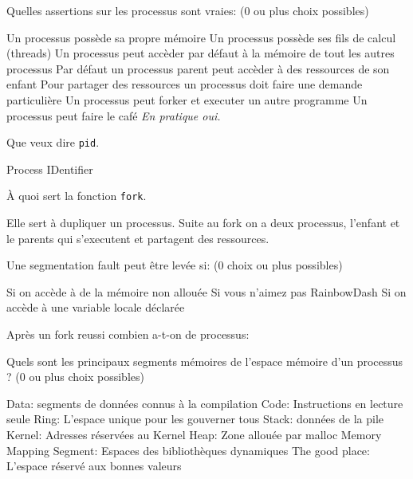 \documentclass[11pt,a4paper,addpoint,answers]{exam}
\begin{document}
  \begin{questions}

    \question[1] Quelles assertions sur les processus sont vraies: (0 ou plus choix possibles)
    \begin{checkboxes}
        \CorrectChoice Un processus possède sa propre mémoire
        \CorrectChoice Un processus possède ses fils de calcul (threads)
        \choice Un processus peut accèder par défaut à la mémoire de tout les autres processus
        \CorrectChoice Par défaut un processus parent peut accèder à des ressources de son enfant
        \CorrectChoice Pour partager des ressources un processus doit faire une demande particulière
        \CorrectChoice Un processus peut forker et executer un autre programme
        \choice Un processus peut faire le café 
        \ifprintanswers
          \emph{En pratique oui.}
        \fi
    \end{checkboxes}
  
    \question[1] Que veux dire \texttt{pid}.
    \ifprintanswers
    \begin{solution}
        Process IDentifier
    \end{solution}
    \else
    \vspace{2in}
    \fi
    
    \question[1] À quoi sert la fonction \texttt{fork}.
    \ifprintanswers
    \begin{solution}
        Elle sert à dupliquer un processus. Suite au fork on a deux processus,
        l'enfant et le parents qui s'executent et partagent des ressources.
    \end{solution}
    \else
    \vspace{2in}
    \fi
    
    \question[2] Une segmentation fault peut être levée si: (0 choix ou plus possibles)
    \begin{checkboxes}
        \CorrectChoice Si on accède à de la mémoire non allouée
        \choice Si vous n'aimez pas RainbowDash
        \choice Si on accède à une variable locale déclarée
    \end{checkboxes}

    \question[1] Après un fork reussi combien a-t-on de processus:
    \begin{checkboxes}
    \end{checkboxes}

    \question[1] Quels sont les principaux segments mémoires de l'espace mémoire d'un processus ?
    (0 ou plus choix possibles)
    \begin{checkboxes}
        \CorrectChoice Data: segments de données connus à la compilation
        \CorrectChoice Code: Instructions en lecture seule
        \choice Ring: L'espace unique pour les gouverner tous
        \CorrectChoice Stack: données de la pile
        \CorrectChoice Kernel: Adresses réservées au Kernel
        \CorrectChoice Heap: Zone allouée par malloc
        \CorrectChoice Memory Mapping Segment: Espaces des bibliothèques dynamiques
        \choice The good place: L'espace réservé aux bonnes valeurs
    \end{checkboxes}
  \end{questions}
\end{document}
